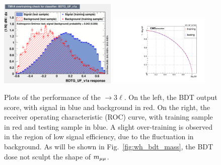 \begin{figure}[!htb]
      \centering
      \captionsetup{justification=justified}
      \includegraphics[width=0.50\textwidth]{pics/VH_sec/BDT_train_WH/WH_BDT_overtrain.pdf}
      \includegraphics[width=0.43\textwidth]{pics/VH_sec/BDT_train_WH/WH_BDT_ROC.pdf}
      \caption{Plots of the performance of the \WH $\to 3\ell$. 
               On the left, the BDT output score, with signal in blue and background in red.  
               On the right, the receiver operating characteristic (ROC) curve, 
               with training sample in red and testing sample in blue. 
               A slight over-training is observed in the region of low signal efficiency, due to the fluctuation in background. 
               As will be shown in Fig.~\ref{fig:wh_bdt_mass}, the BDT dose not sculpt the shape of $m_{\mu\mu}$.}
      \label{fig:wh_bdt_output}
  \end{figure}
  
